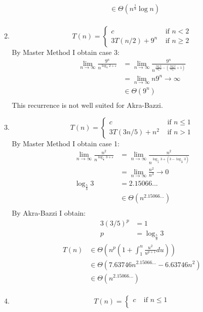 \documentclass[paper=a4,fontsize=11pt]{article}
\begin{document}
\begin{enumerate}
\begin{align*}
    &\in \Theta(n^{\frac{1}{3}}\log{n})\\
\end{align*}
\item
\[
T(n) = \left\{
\begin{array}{cl}
c & \textrm{ if } n < 2\\
3T(n/2) + 9^n & \textrm{ if } n \geq 2
\end{array}
\right.
\]
By Master Method I obtain case 3:
\begin{align*}
    \lim_{n\to\infty}{\frac{9^n}{n^{\log_{3}{2}+\varepsilon}}}&=\lim_{n\to\infty}{\frac{9^n}{n^{\frac{\log{2}}{\log{3}}-(\frac{\log{2}}{\log{3}} + 1)}}}\\
    &=\lim_{n\to\infty}{n9^n}\rightarrow\infty\\
    &\in \Theta(9^n)\\
\end{align*}
This recurrence is not well suited for Akra-Bazzi.
\item
\[
T(n) = \left\{
\begin{array}{cl}
c & \textrm{ if } n \leq 1\\
3T(3n/5) + n^2 & \textrm{ if } n > 1
\end{array}
\right.
\]
By Master Method I obtain case 1:
\begin{align*}
    \lim_{n\to\infty}{\frac{n^2}{n^{\log_{\frac{5}{3}}{3}+\varepsilon}}}&=\lim_{n\to\infty}{\frac{n^2}{n^{\log_{\frac{5}{3}}{3}+(3-\log_{\frac{5}{3}}{3})}}}\\
    &=\lim_{n\to\infty}{\frac{n^2}{n^3}}\rightarrow0\\
    \log_{\frac{5}{3}}{3}&=2.15066...\\
    &\in \Theta(n^{2.15066...})\\
\end{align*}
By Akra-Bazzi I obtain:
\begin{align*}
    3(3/5)^{p}&=1\\
    p&=\log_{\frac{5}{3}}{3}
\end{align*}
\begin{align*}
    T(n) &\in \Theta(n^{p}(1+\int_{1}^{n}{\frac{u^{2}}{u^{p+1}}du}))\\
    &\in \Theta(7.63746 n^{2.15066...}-6.63746 n^{2})\\
    &\in \Theta(n^{2.15066...})\\
\end{align*}
\item
\[
T(n) = \left\{
\begin{array}{cl}
c & \textrm{ if } n \leq 1\\

\end{array}\]
\end{enumerate}
\end{document}
